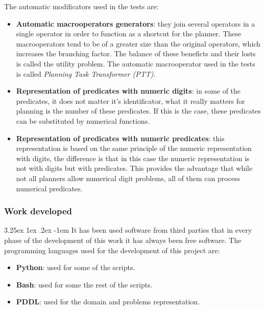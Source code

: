 \documentclass{article}
\makeatletter
\newcounter{subsubsubsection}
\renewcommand\paragraph{\@startsection{paragraph}{5}{\z@}%
      {3.25ex \@plus1ex \@minus.2ex}%
      {-1em}%
      {\normalfont\normalsize\bfseries}}
\makeatother
\begin{document}
    The automatic modificators used in the tests are:
    \begin{itemize}
        \item \textbf{Automatic macrooperators generators}: they join several operators in a single operator in order to function as a shortcut for the planner. These macrooperators tend to be of a greater size than the original operators, which increases the branching factor. The balance of these beneficts and their losts is called the utility problem. The automatic macrooperator used in the tests is called \textit{Planning Task Transformer (PTT)}.
        \item \textbf{Representation of predicates with numeric digits}: in some of the predicates, it does not matter it's identificator, what it really matters for planning is the number of these predicates. If this is the case, these predicates can be substituted by numerical functions.
        \item \textbf{Representation of predicates with numeric predicates}: this representation is based on the same principle of the numeric representation with digits, the difference is that in this case the numeric representation is not with digits but with predicates. This provides the advantage that while not all planners allow numerical digit problems, all of them can process numerical predicates.
    \end{itemize}
    
    \pagebreak
    
    \subsubsection{Work developed}
    \setcounter{subsubsubsection}{0}
    \paragraph{}
    It has been used software from third parties that in every phase of the development of this work it has always been free software. The programming languages used for the development of this project are:
    \begin{itemize}
        \item \textbf{Python}: used for some of the scripts.
        \item \textbf{Bash}: used for some the rest of the scripts.
        \item \textbf{PDDL}: used for the domain and problems representation.
    \end{itemize}
    
\end{document}
